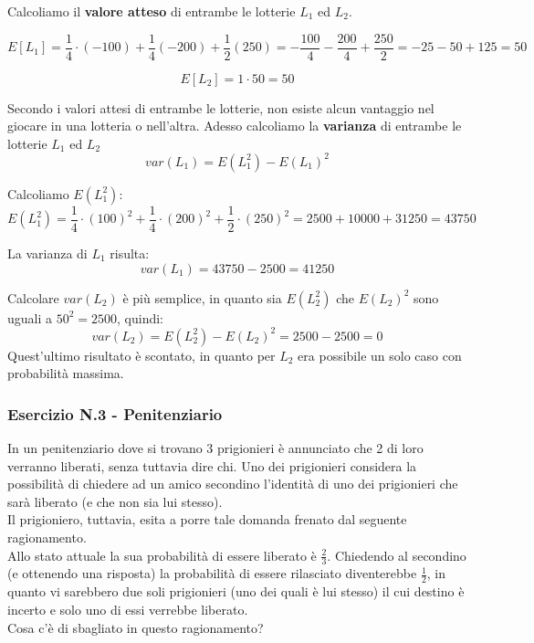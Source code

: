 Calcoliamo il \textbf{valore atteso} di entrambe le lotterie $L_1$ ed $L_2$.

$$
E[L_1] = \frac{1}{4} \cdot(-100) + \frac{1}{4} (-200) + \frac{1}{2} (250) = -\frac{100}{4} - \frac{200}{4} + \frac{250}{2} = -25 - 50 + 125 = 50
$$

$$
E[L_2] = 1 \cdot 50 = 50
$$

Secondo i valori attesi di entrambe le lotterie, non esiste alcun vantaggio nel giocare in una lotteria o nell'altra. Adesso calcoliamo la \textbf{varianza} di entrambe le lotterie $L_1$ ed $L_2$
\\
$$
var(L_1) = E(L_1^2) - E(L_1)^2	
$$

Calcoliamo $E(L_1^2)$:
$$
E(L_1^2) = \frac{1}{4} \cdot(100)^2 + \frac{1}{4}\cdot(200)^2 + \frac{1}{2} \cdot(250)^2 = 2500 + 10000 + 31250 = 43750
$$

La varianza di $L_1$ risulta:
$$
var(L_1) = 43750 - 2500 = 41250
$$

Calcolare $var(L_2)$ è più semplice, in quanto sia $E(L_2^2)$ che $E(L_2)^2$ sono uguali a $50^2 = 2500$, quindi:
$$
var(L_2) = E(L_2^2) - E(L_2)^2 = 2500 - 2500 = 0
$$
Quest'ultimo risultato è scontato, in quanto per $L_2$ era possibile un solo caso con probabilità massima.

\subsubsection{Esercizio N.3 - Penitenziario}
In un penitenziario dove si trovano 3 prigionieri è annunciato che 2 di loro verranno liberati, senza tuttavia dire chi.
Uno dei prigionieri considera la possibilità di chiedere ad un amico secondino l’identità di uno dei prigionieri che sarà liberato (e che non sia lui stesso).\\ Il prigioniero, tuttavia, esita a porre tale domanda frenato dal seguente ragionamento.\\
Allo stato attuale la sua probabilità di essere liberato è $\frac{2}{3}$. Chiedendo al secondino (e ottenendo una risposta) la probabilità di essere rilasciato diventerebbe $\frac{1}{2}$, in quanto vi sarebbero due soli prigionieri
(uno dei quali è lui stesso) il cui destino è incerto e solo uno di essi verrebbe liberato. \\
Cosa c’è di sbagliato in questo ragionamento?\\

